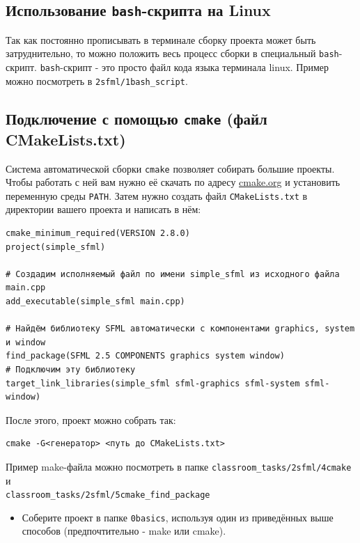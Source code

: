 \documentclass{article}
\begin{document}
\iffalse
\subsection*{Использование \texttt{bash}-скрипта на Linux} 
Так как постоянно прописывать в терминале сборку проекта может быть затруднительно, то можно положить весь процесс сборки в специальный \texttt{bash}-скрипт. \texttt{bash}-скрипт - это просто файл кода языка терминала linux. Пример можно посмотреть в \texttt{2sfml/1bash\_script}.



\newpage
\subsection*{Подключение с помощью \texttt{cmake} (файл CMakeLists.txt)}
Система автоматической сборки \texttt{cmake} позволяет собирать большие проекты. Чтобы работать с ней вам нужно её скачать по адресу \href{https://cmake.org/}{cmake.org} и установить переменную среды \texttt{PATH}. Затем нужно создать файл \texttt{CMakeLists.txt} в директории вашего проекта и написать в нём:
\begin{verbatim}
cmake_minimum_required(VERSION 2.8.0)
project(simple_sfml)
 
# Создадим исполняемый файл по имени simple_sfml из исходного файла main.cpp
add_executable(simple_sfml main.cpp)

# Найдём библиотеку SFML автоматически с компонентами graphics, system и window
find_package(SFML 2.5 COMPONENTS graphics system window)
# Подключим эту библиотеку
target_link_libraries(simple_sfml sfml-graphics sfml-system sfml-window)
\end{verbatim}

После этого, проект можно собрать так:
\begin{verbatim}
cmake -G<генератор> <путь до CMakeLists.txt>
\end{verbatim}

Пример make-файла можно посмотреть в папке \texttt{classroom\_tasks/2sfml/4cmake} и\\ \texttt{classroom\_tasks/2sfml/5cmake\_find\_package}\\
\begin{itemize}
\item Соберите проект в папке \texttt{0basics}, используя один из приведённых выше способов (предпочтительно - make или cmake). 
\end{itemize}


\newpage
\end{document}
